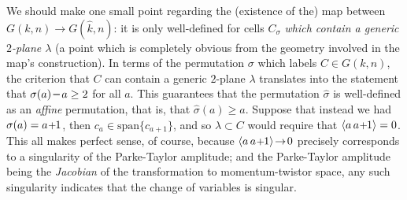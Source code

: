 \documentclass[12pt,hyperref,compress]{JHEP3}
\renewcommand{\hat}{\widehat}
\newcommand{\mi}{{\rm\rule[2.4pt]{6pt}{0.65pt}}}
\newcommand{\pl}{\hspace{0.5pt}\text{{\small+}}\hspace{-0.5pt}}
\newcommand{\ab}[1]{\langle #1 \rangle}
\begin{document}
{We should make one small point regarding the (existence of the) map between $G(k,n)\!\to\!G(\hat{k},n)$: it is only well-defined for cells $C_{\sigma}$ {\it which contain a generic $2$-plane $\lambda$} (a point which is completely obvious from the geometry involved in the map's construction). In terms of the permutation $\sigma$ which labels $C\!\in\!G(k,n)$, the criterion that $C$ can contain a generic $2$-plane $\lambda$ translates into the statement that $\sigma(a)\,\mi\,a\geq 2$ for all $a$. This guarantees that the permutation $\hat{\sigma}$ is well-defined as an {\it affine} permutation, that is, that $\hat{\sigma}(a) \geq a$. Suppose that instead we had $\sigma(a)=a\pl1$, then $c_{a}\in\mathrm{span}\{c_{a+1}\}$, and so $\lambda\!\subset\!C$ would require that $\ab{a\,a\pl1}=0$. This all makes perfect sense, of course, because $\ab{a\,a\pl1}\!\to\!0$ precisely corresponds to a singularity of the Parke-Taylor amplitude; and the Parke-Taylor amplitude being the {\it Jacobian} of the transformation to momentum-twistor space, any such singularity indicates that the change of variables is singular.

}
\end{document}
